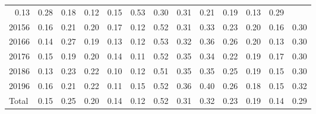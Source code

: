 \begin{table}[!h]
\begin{tabular}{lllllllllllll}
  \multicolumn{1}{|r}{0.13} &
  \multicolumn{1}{r}{0.28} &
  \multicolumn{1}{r}{0.18} &
  \multicolumn{1}{r}{0.12} &
  \multicolumn{1}{r}{0.15} &
  \multicolumn{1}{r}{0.53} &
  \multicolumn{1}{r}{0.30} &
  \multicolumn{1}{r}{0.31} &
  \multicolumn{1}{r}{0.21} &
  \multicolumn{1}{r}{0.19} &
  \multicolumn{1}{r}{0.13} &
  \multicolumn{1}{r}{0.29} \\
\multicolumn{1}{l}{\hspace{1em}20156} &
  \multicolumn{1}{|r}{0.16} &
  \multicolumn{1}{r}{0.21} &
  \multicolumn{1}{r}{0.20} &
  \multicolumn{1}{r}{0.17} &
  \multicolumn{1}{r}{0.12} &
  \multicolumn{1}{r}{0.52} &
  \multicolumn{1}{r}{0.31} &
  \multicolumn{1}{r}{0.33} &
  \multicolumn{1}{r}{0.23} &
  \multicolumn{1}{r}{0.20} &
  \multicolumn{1}{r}{0.16} &
  \multicolumn{1}{r}{0.30} \\
\multicolumn{1}{l}{\hspace{1em}20166} &
  \multicolumn{1}{|r}{0.14} &
  \multicolumn{1}{r}{0.27} &
  \multicolumn{1}{r}{0.19} &
  \multicolumn{1}{r}{0.13} &
  \multicolumn{1}{r}{0.12} &
  \multicolumn{1}{r}{0.53} &
  \multicolumn{1}{r}{0.32} &
  \multicolumn{1}{r}{0.36} &
  \multicolumn{1}{r}{0.26} &
  \multicolumn{1}{r}{0.20} &
  \multicolumn{1}{r}{0.13} &
  \multicolumn{1}{r}{0.30} \\
\multicolumn{1}{l}{\hspace{1em}20176} &
  \multicolumn{1}{|r}{0.15} &
  \multicolumn{1}{r}{0.19} &
  \multicolumn{1}{r}{0.20} &
  \multicolumn{1}{r}{0.14} &
  \multicolumn{1}{r}{0.11} &
  \multicolumn{1}{r}{0.52} &
  \multicolumn{1}{r}{0.35} &
  \multicolumn{1}{r}{0.34} &
  \multicolumn{1}{r}{0.22} &
  \multicolumn{1}{r}{0.19} &
  \multicolumn{1}{r}{0.17} &
  \multicolumn{1}{r}{0.30} \\
\multicolumn{1}{l}{\hspace{1em}20186} &
  \multicolumn{1}{|r}{0.13} &
  \multicolumn{1}{r}{0.23} &
  \multicolumn{1}{r}{0.22} &
  \multicolumn{1}{r}{0.10} &
  \multicolumn{1}{r}{0.12} &
  \multicolumn{1}{r}{0.51} &
  \multicolumn{1}{r}{0.35} &
  \multicolumn{1}{r}{0.35} &
  \multicolumn{1}{r}{0.25} &
  \multicolumn{1}{r}{0.19} &
  \multicolumn{1}{r}{0.15} &
  \multicolumn{1}{r}{0.30} \\
\multicolumn{1}{l}{\hspace{1em}20196} &
  \multicolumn{1}{|r}{0.16} &
  \multicolumn{1}{r}{0.21} &
  \multicolumn{1}{r}{0.22} &
  \multicolumn{1}{r}{0.11} &
  \multicolumn{1}{r}{0.15} &
  \multicolumn{1}{r}{0.52} &
  \multicolumn{1}{r}{0.36} &
  \multicolumn{1}{r}{0.40} &
  \multicolumn{1}{r}{0.26} &
  \multicolumn{1}{r}{0.18} &
  \multicolumn{1}{r}{0.15} &
  \multicolumn{1}{r}{0.32} \\
\multicolumn{1}{l}{\hspace{1em}Total} &
  \multicolumn{1}{|r}{0.15} &
  \multicolumn{1}{r}{0.25} &
  \multicolumn{1}{r}{0.20} &
  \multicolumn{1}{r}{0.14} &
  \multicolumn{1}{r}{0.12} &
  \multicolumn{1}{r}{0.52} &
  \multicolumn{1}{r}{0.31} &
  \multicolumn{1}{r}{0.32} &
  \multicolumn{1}{r}{0.23} &
  \multicolumn{1}{r}{0.19} &
  \multicolumn{1}{r}{0.14} &
  \multicolumn{1}{r}{0.29} \\
\cline{1-13}
\end{tabular}
\end{table}
